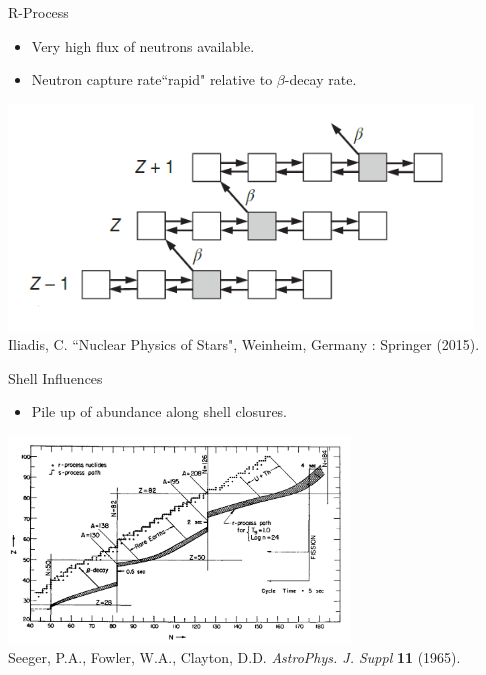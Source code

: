 \documentclass{beamer}
\begin{document}

\begin{frame}{R-Process}

\begin{itemize}
    \item Very high flux of neutrons available.
    \item Neutron capture rate``rapid" relative to $\beta$-decay rate.
\end{itemize}

        \centering
        \includegraphics[height=6cm]{isotopicChain2}
        \\{\tiny Iliadis, C. ``Nuclear Physics of Stars", Weinheim, Germany : Springer (2015).}

\end{frame}

\begin{frame}{Shell Influences}
    \begin{itemize}
        \item Pile up of abundance along shell closures.
    \end{itemize}
    
       \centering
        \includegraphics[height = 5.5cm]{RProcessPath}
       \\{\tiny Seeger, P.A., Fowler, W.A., Clayton, D.D. \textit{AstroPhys. J. Suppl} \textbf{11} (1965).}
       
       
\end{frame}
\end{document}
